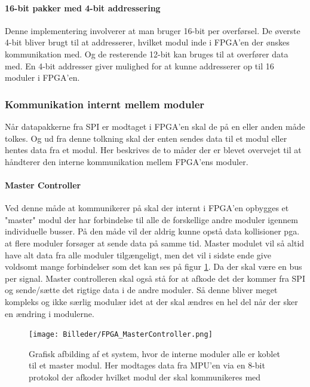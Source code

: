 \paragraph*{16-bit pakker med 4-bit addressering}
Denne implementering involverer at man bruger 16-bit per overførsel. De øverste 4-bit bliver brugt til at addresserer, hvilket modul inde i FPGA'en der ønskes kommunikation med. Og de resterende 12-bit kan bruges til at overfører data med. En 4-bit addresser giver mulighed for at kunne addresserer op til 16 moduler i FPGA'en.

\subsubsection{Kommunikation internt mellem moduler}
Når datapakkerne fra SPI er modtaget i FPGA'en skal de på en eller anden måde tolkes. Og ud fra denne tolkning skal der enten sendes data til et modul eller hentes data fra et modul. Her beskrives de to måder der er blevet overvejet til at håndterer den interne kommunikation mellem FPGA'ens moduler.

\paragraph*{Master Controller}
Ved denne måde at kommunikerer på skal der internt i FPGA'en opbygges et "master" modul der har forbindelse til alle de forskellige andre moduler igennem individuelle busser. På den måde vil der aldrig kunne opstå data kollisioner pga. at flere moduler forsøger at sende data på samme tid. Master modulet vil så altid have alt data fra alle moduler tilgængeligt, men det vil i sidste ende give voldsomt mange forbindelser som det kan ses på figur \ref{fig:FPGA_MasterController}. Da der skal være en bus per signal. Master controlleren skal også stå for at afkode det der kommer fra SPI og sende/sætte det rigtige data i de andre moduler. Så denne bliver meget kompleks og ikke særlig modulær idet at der skal ændres en hel del når der sker en ændring i modulerne.

\begin{figure}[ht]
	\begin{center}
		\texttt{[image: Billeder/FPGA\_MasterController.png]}
	\end{center}
\caption{Grafisk afbilding af et system, hvor de interne moduler alle er koblet til et master modul. Her modtages data fra MPU'en via en 8-bit protokol der afkoder hvilket modul der skal kommunikeres med}
\label{fig:FPGA_MasterController}
\end{figure}

